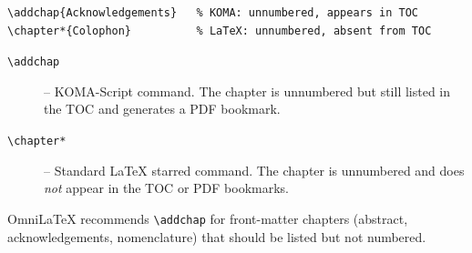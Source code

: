 \begin{verbatim}
\addchap{Acknowledgements}   % KOMA: unnumbered, appears in TOC
\chapter*{Colophon}          % LaTeX: unnumbered, absent from TOC
\end{verbatim}

\begin{description}
  \item[{\texttt{\textbackslash addchap}}] -- KOMA-Script command.  The chapter
        is unnumbered but still listed in the TOC and generates a PDF bookmark.
  \item[{\texttt{\textbackslash chapter*}}] -- Standard LaTeX starred command.
        The chapter is unnumbered and does \emph{not} appear in the TOC or PDF
        bookmarks.
\end{description}

OmniLaTeX recommends \verb|\addchap| for front-matter chapters (abstract,
acknowledgements, nomenclature) that should be listed but not numbered.
